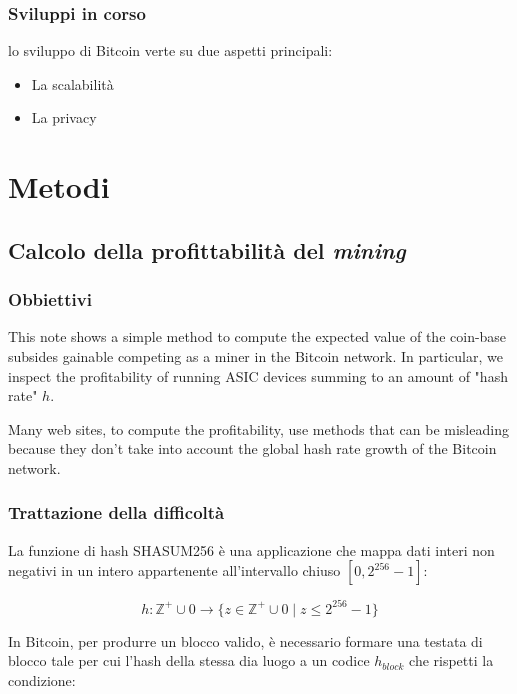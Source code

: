 \documentclass{book}
\theoremstyle{definition}
\begin{document}
\newpage
\section{Sviluppi in corso}

lo sviluppo di Bitcoin verte su due aspetti principali:

\begin{itemize}
    \item La scalabilità
    \item La privacy
\end{itemize}

\newpage
\part{Metodi}

\chapter{Calcolo della profittabilità del \textit{mining}}

\section{Obbiettivi}

This note shows a simple method to compute the expected value of the coin-base subsides gainable competing as a miner in the Bitcoin network.
In particular, we inspect the profitability of running ASIC devices summing to an amount of "hash rate" $h$.

Many web sites, to compute the profitability, use methods that can be misleading because they don't take into account the global hash rate growth of the Bitcoin network.

\section{Trattazione della difficoltà}

La funzione di hash SHASUM256 è una applicazione che mappa dati interi non negativi in un intero appartenente all'intervallo chiuso $ \left [0, 2^{256} - 1 \right ]$:

\begin{equation}
    h: \mathbb{Z}^{+} \cup {0} \rightarrow \{ z \in \mathbb{Z}^{+} \cup {0} \mid z  \leq 2^{256} - 1 \} \label{applicazione_hash}
\end{equation}

In Bitcoin, per produrre un blocco valido, è necessario formare una testata di blocco tale per cui l'hash della stessa dia luogo a un codice $h_{block}$ che rispetti la condizione:
\end{document}
